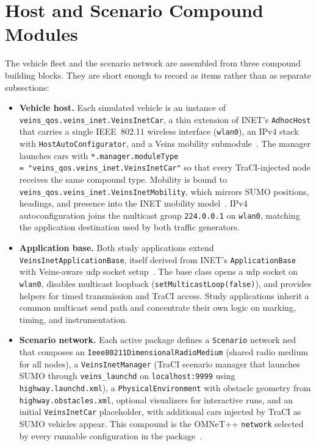 \section{Host and Scenario Compound Modules}
\label{sec:impl:host}

The vehicle fleet and the scenario network are assembled from three compound building blocks.
They are short enough to record as items rather than as separate subsections:

\begin{itemize}[leftmargin=2em]
  \item \textbf{Vehicle host.} Each simulated vehicle is an instance of \texttt{veins\_qos.\allowbreak veins\_inet.\allowbreak VeinsInetCar}, a thin extension of INET's \texttt{AdhocHost} that carries a single IEEE~802.11 wireless interface (\texttt{wlan0}), an IPv4 stack with \texttt{HostAutoConfigurator}, and a Veins mobility submodule~\cite{inet_framework,aguiar2026_veins_qos}. The manager launches cars with \texttt{*.manager.moduleType =\allowbreak\ "veins\_qos.\allowbreak veins\_inet.\allowbreak VeinsInetCar"} so that every TraCI-injected node receives the same compound type. Mobility is bound to \texttt{veins\_qos.\allowbreak veins\_inet.\allowbreak VeinsInetMobility}, which mirrors SUMO positions, headings, and presence into the INET mobility model~\cite{veins_sommer2011}. IPv4 autoconfiguration joins the multicast group \texttt{224.0.0.1} on \texttt{wlan0}, matching the application destination used by both traffic generators.
  \item \textbf{Application base.} Both study applications extend \texttt{VeinsInet\allowbreak ApplicationBase}, itself derived from INET's \texttt{ApplicationBase} with Veins-aware \gls{udp} socket setup~\cite{inet_framework,aguiar2026_veins_qos}. The base class opens a \gls{udp} socket on \texttt{wlan0}, disables multicast loopback (\texttt{setMulticastLoop(false)}), and provides helpers for timed transmission and TraCI access. Study applications inherit a common multicast send path and concentrate their own logic on marking, timing, and instrumentation.
  \item \textbf{Scenario network.} Each active package defines a \texttt{Scenario} network \gls{ned} that composes an \texttt{Ieee80211\allowbreak DimensionalRadioMedium} (shared radio medium for all nodes), a \texttt{VeinsInetManager} (TraCI scenario manager that launches SUMO through \texttt{veins\_launchd} on \texttt{localhost:9999} using \texttt{highway.launchd.xml}), a \texttt{PhysicalEnvironment} with obstacle geometry from \texttt{highway.obstacles.xml}, optional visualizers for interactive runs, and an initial \texttt{VeinsInetCar} placeholder, with additional cars injected by TraCI as SUMO vehicles appear. This compound is the OMNeT++ \texttt{network} selected by every runnable configuration in the package~\cite{aguiar2026_veins_qos}.
\end{itemize}

